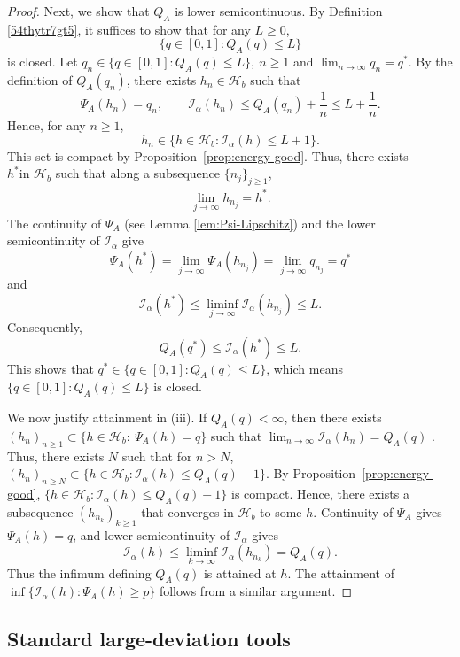 \documentclass[a4paper, 11pt]{article}
\newcommand{\1}{\mathbf 1}
\theoremstyle{plain}
\begin{document}
\begin{proof}
Next, we show that $Q_A$ is lower semicontinuous. By Definition \ref{54thytr7gt5}, it suffices to show that for any $L\geq0$,
\[
 \{q\in[0,1]:Q_A(q)\leq L\}
\]
is closed. Let $q_n\in\{q\in[0,1]:Q_A(q)\leq L\},~n\geq1$ and $\lim_{n\to\infty}q_n=q^*$.
By the definition of \(Q_A(q_n)\), there exists
\(h_n\in\mathcal{H}_b\) such that
\[
  \Psi_A(h_n)=q_n,
  \qquad
  \mathcal{I_{\alpha}}(h_n)\leq Q_A(q_n)+\frac1n
  \leq L+\frac1n.
\]
Hence, for any $n\geq1$,
\[
  h_n\in\{h\in\mathcal{H}_b:\mathcal{I_{\alpha}}(h)\leq L+1\}.
\]
This set is compact by Proposition~\ref{prop:energy-good}. Thus, there exists $h^*\text{in }\mathcal{H}_b$ such that along a subsequence $\{n_j\}_{j\geq1}$,
\begin{align}\label{4tgty6gr4tyr4}
  \lim_{j\to\infty}h_{n_j}=h^*.
\end{align}
The continuity of \(\Psi_A\) (see Lemma \ref{lem:Psi-Lipschitz}) and the lower semicontinuity of \(\mathcal{I_{\alpha}}\)
give
\[
  \Psi_A(h^*)
  =\lim_{j\to\infty}\Psi_A(h_{n_j})
  =\lim_{j\to\infty}q_{n_j}
  =q^*
\]
and
\[
  \mathcal{I_{\alpha}}(h^*)
  \leq\liminf_{j\to\infty}\mathcal{I_{\alpha}}(h_{n_j})
  \leq L.
\]
Consequently,
\[
  Q_A(q^*)\leq\mathcal{I_{\alpha}}(h^*)\leq L.
\]
This shows that $q^*\in\{q\in[0,1]:Q_A(q)\leq L\}$, which means $\{q\in[0,1]:Q_A(q)\leq L\}$ is closed.
\par
We now justify attainment in (iii). If \(Q_A(q)<\infty\), then there exists \((h_n)_{n\geq1}\subset\{h\in\mathcal{H}_b:\ \Psi_A(h)=q\}\) such that $\lim_{n\to\infty}\mathcal{I_{\alpha}}(h_n)=Q_A(q)$ . Thus, there exists $N$ such that for $n>N$, $(h_n)_{n\geq N}\subset\{h\in\mathcal{H}_b: \mathcal{I_{\alpha}}(h)\leq Q_A(q)+1\}$.
By Proposition~\ref{prop:energy-good}, $\{h\in\mathcal{H}_b: \mathcal{I_{\alpha}}(h)\leq Q_A(q)+1\}$ is compact. Hence, there exists a subsequence \((h_{n_k})_{k\geq1}\) that converges in \(\mathcal{H}_b\) to some \(h\).  Continuity of \(\Psi_A\)
gives \(\Psi_A(h)=q\), and lower semicontinuity of \(\mathcal{I_{\alpha}}\) gives
\[
  \mathcal{I_{\alpha}}(h)\leq\liminf_{k\to\infty}\mathcal{I_{\alpha}}(h_{n_k})=Q_A(q).
\]
Thus the infimum defining $Q_A(q)$ is attained at $h$. The attainment of $\inf\{\mathcal{I_{\alpha}}(h):\Psi_A(h)\geq p\}$ follows from a similar argument.
\end{proof}

\subsection{Standard large-deviation tools}\label{4gtgetg4r}
\end{document}
